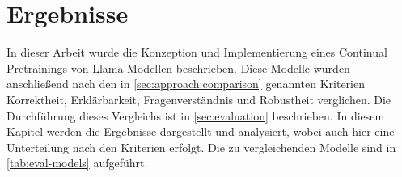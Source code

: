 \chapter{Ergebnisse}\label{ch:results}
\newcommand{\gpt}{\texttt{gpt$4$}}
\newcommand{\lo}{\texttt{llama$2$\_$0$e}}
\newcommand{\liv}{\texttt{llama$2$\_\allowbreak{}$1$e\_v$100$}}
\newcommand{\lia}{\texttt{llama$2$\_\allowbreak{}$1$e\_a$30$}}
\newcommand{\lev}{\texttt{llama$2$\_\allowbreak{}$3$e\_v$100$}}
\newcommand{\lea}{\texttt{llama$2$\_\allowbreak{}$3$e\_a$30$}}
\newcommand{\lsa}{\texttt{llama$2$\_\allowbreak{}$5$e\_a$30$}}
\newcommand{\lioa}{\texttt{llama$2$\_\allowbreak{}$10$e\_a$30$}}

\newcommand{\pic}[5][1]{
    \begin{figure}
        \makebox[\textwidth][c]{\texttt{[image: \#2]}}
        \caption[#3]{#4}\label{#5}
    \end{figure}
}
\newcommand{\pich}[5][1]{
    \begin{figure}[H]
        \makebox[\textwidth][c]{\texttt{[image: \#2]}}
        \caption[#3]{#4}\label{#5}
    \end{figure}
}
In dieser Arbeit wurde die Konzeption und Implementierung eines Continual Pretrainings von Llama-Modellen beschrieben.
Diese Modelle wurden anschließend nach den in \cref{sec:approach:comparison} genannten Kriterien Korrektheit, Erklärbarkeit, Fragenverständnis und Robustheit verglichen.
Die Durchführung dieses Vergleichs ist in \cref{sec:evaluation} beschrieben.
In diesem Kapitel werden die Ergebnisse dargestellt und analysiert, wobei auch hier eine Unterteilung nach den Kriterien erfolgt.
Die zu vergleichenden Modelle sind in \cref{tab:eval-models} aufgeführt.



